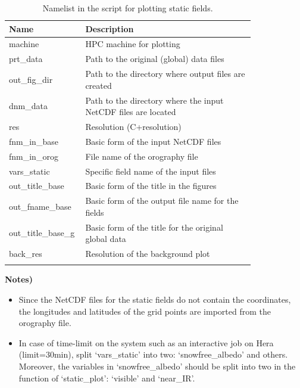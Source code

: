 \documentclass[11pt,fleqn]{report}              %
\begin{document}
\begin{enumerate}
{
\fontsize{10}{12}\selectfont
\begin{longtable}{p{0.17\linewidth} | p{0.65\linewidth} }
\hline
\hline
 Name & Description \\
\hline
 machine & HPC machine for plotting \\
 prt\_data & Path to the original (global) data files \\
 out\_fig\_dir & Path to the directory where output files are created \\
 dnm\_data & Path to the directory where the input NetCDF files are located   \\
 res & Resolution (C+resolution) \\
 fnm\_in\_base & Basic form of the input NetCDF files \\
 fnm\_in\_orog & File name of the orography file \\
 vars\_static & Specific field name of the input files \\
 out\_title\_base & Basic form of the title in the figures \\
 out\_fname\_base & Basic form of the output file name for the fields \\
 out\_title\_base\_g & Basic form of the title for the original global data \\
 back\_res & Resolution of the background plot \\
\hline
\caption{Namelist in the script for plotting static fields.}
\label{table:fv3_var_static}
\end{longtable}
}

{\bf Notes)}
\begin{itemize}
\item Since the NetCDF files for the static fields do not contain the coordinates, the longitudes and latitudes of the grid points are imported from the orography file.
\item In case of time-limit on the system such as an interactive job on Hera (limit=30min), split `vars\_static' into two: `snowfree\_albedo' and others. Moreover, the variables in `snowfree\_albedo' should be split into two in the function of `static\_plot': `visible' and `near\_IR'.
\end{itemize}



\end{enumerate}
\end{document}
